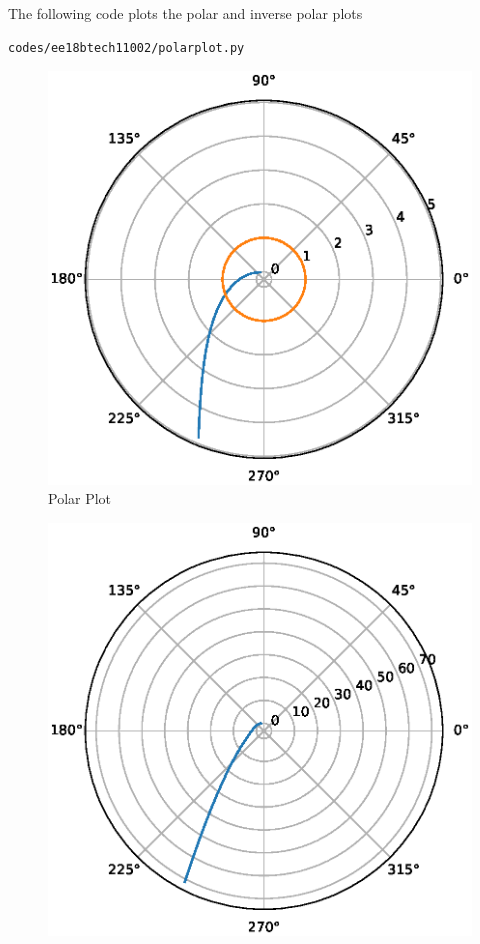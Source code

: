 \begin{enumerate}[label=\thesection.\arabic*.,ref=\thesection.\theenumi]
The following code plots the polar and inverse polar plots 
\begin{lstlisting}
codes/ee18btech11002/polarplot.py
\end{lstlisting}
\begin{figure}
\centering
\includegraphics[width=\columnwidth]{./figs/ee18btech11002(a).eps}
\caption{Polar Plot}
\label{fig:polar_plot}
\end{figure}
\begin{figure}
\centering
\includegraphics[width=\columnwidth]{./figs/ee18btech11002(b).eps}

\end{figure}
\end{enumerate}
